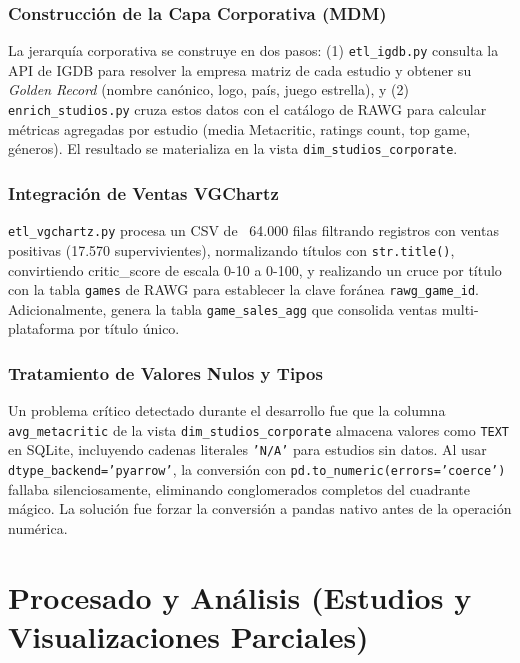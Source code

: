 \documentclass[11pt,a4paper]{article}
\begin{document}
\subsubsection{Construcción de la Capa Corporativa (MDM)}
La jerarquía corporativa se construye en dos pasos: (1) \texttt{etl\_igdb.py} consulta la API de IGDB para resolver la empresa matriz de cada estudio y obtener su \textit{Golden Record} (nombre canónico, logo, país, juego estrella), y (2) \texttt{enrich\_studios.py} cruza estos datos con el catálogo de RAWG para calcular métricas agregadas por estudio (media Metacritic, ratings count, top game, géneros). El resultado se materializa en la vista \texttt{dim\_studios\_corporate}.

\subsubsection{Integración de Ventas VGChartz}
\texttt{etl\_vgchartz.py} procesa un CSV de ~64.000 filas filtrando registros con ventas positivas (17.570 supervivientes), normalizando títulos con \texttt{str.title()}, convirtiendo critic\_score de escala 0-10 a 0-100, y realizando un cruce por título con la tabla \texttt{games} de RAWG para establecer la clave foránea \texttt{rawg\_game\_id}. Adicionalmente, genera la tabla \texttt{game\_sales\_agg} que consolida ventas multi-plataforma por título único.

\subsubsection{Tratamiento de Valores Nulos y Tipos}
Un problema crítico detectado durante el desarrollo fue que la columna \texttt{avg\_metacritic} de la vista \texttt{dim\_studios\_corporate} almacena valores como \texttt{TEXT} en SQLite, incluyendo cadenas literales \texttt{'N/A'} para estudios sin datos. Al usar \texttt{dtype\_backend='pyarrow'}, la conversión con \texttt{pd.to\_numeric(errors='coerce')} fallaba silenciosamente, eliminando conglomerados completos del cuadrante mágico. La solución fue forzar la conversión a pandas nativo antes de la operación numérica.


\newpage
\section{Procesado y Análisis (Estudios y Visualizaciones Parciales)}
\end{document}
